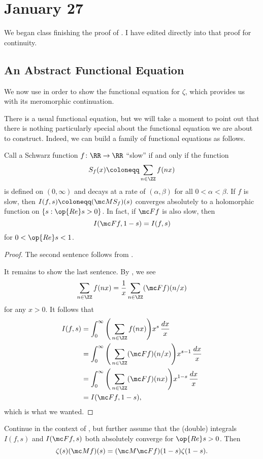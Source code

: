 \documentclass[../notes.tex]{subfiles}
\begin{document}
\section{January 27}

We began class finishing the proof of . I have edited directly into that proof for continuity.

\subsection{An Abstract Functional Equation}
We now use  in order to show the functional equation for $\zeta$, which provides us with its meromorphic continuation.

There is a usual functional equation, but we will take a moment to point out that there is nothing particularly special about the functional equation we are about to construct. Indeed, we can build a family of functional equations as follows.
\begin{proposition} \label{prop:int-functional-eq}
	Call a Schwarz function $f\colon\RR\to\RR$ ``slow'' if and only if the function
	\[S_f(x)\coloneqq\sum_{n\in\ZZ}f(nx)\]
	is defined on $(0,\infty)$ and decays at a rate of $(\alpha,\beta)$ for all $0<\alpha<\beta$. If $f$ is slow, then $I(f,s)\coloneqq(\mc MS_f)(s)$ converges absolutely to a holomorphic function on $\{s:\op{Re}s>0\}$. In fact, if $\mc Ff$ is also slow, then
	\[I(\mc Ff,1-s)=I(f,s)\]
	for $0<\op{Re}s<1$.
\end{proposition}
\begin{proof}
	The second sentence follows from .

	It remains to show the last sentence. By , we see
	\[\sum_{n\in\ZZ}f(nx)=\frac1x\sum_{n\in\ZZ}(\mc Ff)(n/x)\]
	for any $x>0$. It follows that
	\begin{align*}
		I(f,s) &= \int_0^\infty\Bigg(\sum_{n\in\ZZ}f(nx)\Bigg)x^s\,\frac{dx}x \\
		&= \int_0^\infty\Bigg(\sum_{n\in\ZZ}(\mc Ff)(n/x)\Bigg)x^{s-1}\,\frac{dx}x \\
		&= \int_0^\infty\Bigg(\sum_{n\in\ZZ}(\mc Ff)(nx)\Bigg)x^{1-s}\,\frac{dx}x \\
		&= I(\mc Ff,1-s),
	\end{align*}
	which is what we wanted.
\end{proof}
\begin{corollary} \label{cor:abstract-func-eq}
	Continue in the context of , but further assume that the (double) integrals $I(f,s)$ and $I(\mc Ff,s)$ both absolutely converge for $\op{Re}s>0$. Then
	\[\zeta(s)(\mc Mf)(s)=(\mc M\mc Ff)(1-s)\zeta(1-s).\]
\end{corollary}
\end{document}
